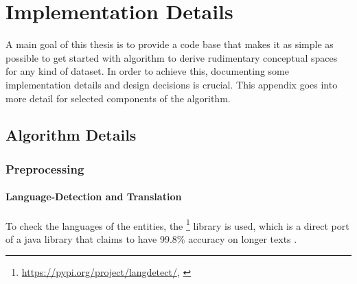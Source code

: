 




\chapter{Implementation Details} %

A main goal of this thesis is to provide a code base that makes it as simple as possible to get started with  algorithm to derive rudimentary conceptual spaces for any kind of dataset. In order to achieve this, documenting some implementation details and design decisions is crucial.
This appendix goes into more detail for selected components of the algorithm.

\label{AppendixB} 

\section{Algorithm Details}

\subsection*{Preprocessing}

\subsubsection*{Language-Detection and Translation}
\label{ap:translating}

To check the languages of the entities, the \footnote{\url{https://pypi.org/project/langdetect/}, \textcite{nakatani2010langdetect}} library is used, which is a direct port of a java library that claims to have 99.8\% accuracy on longer texts \cite{nakatani2010langdetect}. 
\newline

